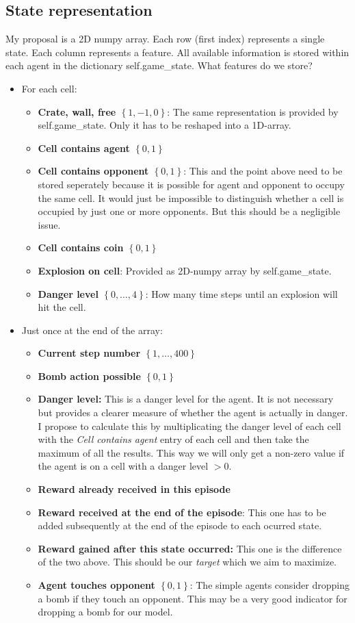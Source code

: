 \documentclass[12pt]{report}
\newcommand{\code}[1]{{\fontfamily{pcr}\selectfont #1}}
\newcommand{\state}[1]{$\left\lbrace #1 \right\rbrace$}
\begin{document}
\subsection{State representation}
My proposal is a 2D numpy array. Each row (first index) represents a single state. Each column represents a feature. All available information is stored within each agent in the dictionary \code{self.game\_state}. What features do we store?
	\begin{itemize}
		\item For each cell:
		\begin{itemize}
			\item \textbf{Crate, wall, free \state{1,-1,0}}: The same representation is provided by \code{self.game\_state}. Only it has to be reshaped into a 1D-array. 
			\item \textbf{Cell contains agent \state{0,1}}
			\item \textbf{Cell contains opponent \state{0,1}}: This and the point above need to be stored seperately because it is possible for agent and opponent to occupy the same cell. It would just be impossible to distinguish whether a cell is occupied by just one or more opponents. But this should be a negligible issue. 
			\item \textbf{Cell contains coin \state{0,1}}
			\item \textbf{Explosion on cell}: Provided as 2D-numpy array by \code{self.game\_state}.
			\item \textbf{Danger level \state{0,\dots,4}}: How many time steps until an explosion will hit the cell.
		\end{itemize}
		\item Just once at the end of the array:
		\begin{itemize}
			\item \textbf{Current step number \state{1,\dots,400}}
			\item \textbf{Bomb action possible \state{0,1}}
			\item \textbf{Danger level:} This is a danger level for the agent. It is not necessary but provides a clearer measure of whether the agent is actually in danger. I propose to calculate this by multiplicating the danger level of each cell with the \textit{Cell contains agent} entry of each cell and then take the maximum of all the results. This way we will only get a non-zero value if the agent is on a cell with a danger level $>0$.
			\item \textbf{Reward already received in this episode}
			\item \textbf{Reward received at the end of the episode}: This one has to be added subsequently at the end of the episode to each ocurred state.
			\item \textbf{Reward gained after this state occurred:} This one is the difference of the two above. This should be our \textit{target} which we aim to maximize.
			\item \textbf{Agent touches opponent \state{0,1}}: The simple agents consider dropping a bomb if they touch an opponent. This may be a very good indicator for dropping a bomb for our model.
		\end{itemize}
	\end{itemize}
\end{document}
